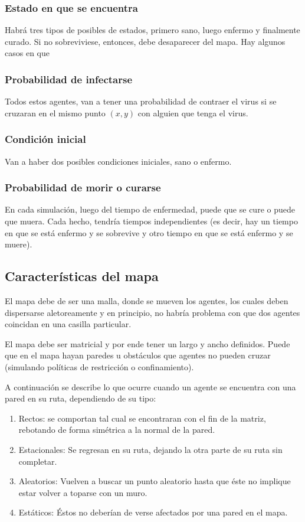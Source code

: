 \documentclass[11pt]{article}
\begin{document}
\subsubsection{Estado en que se encuentra}
Habrá tres tipos de posibles de estados, primero sano, luego enfermo y finalmente curado. Si no sobreviviese, entonces, debe desaparecer del mapa. Hay algunos casos en que 

\subsubsection{Probabilidad de infectarse}
Todos estos agentes, van a tener una probabilidad de contraer el virus si se cruzaran en el mismo punto $(x,y)$ con alguien que tenga el virus. 

\subsubsection{Condición inicial}
Van a haber dos posibles condiciones iniciales, sano o enfermo.

\subsubsection{Probabilidad de morir o curarse}
En cada simulación, luego del tiempo de enfermedad, puede que se cure o puede que muera. Cada hecho, tendría tiempos independientes (es decir, hay un tiempo en que se está enfermo y se sobrevive y otro tiempo en que se está enfermo y se muere). 	

\subsection{Características del mapa}

El mapa debe de ser una malla, donde se mueven los agentes, los cuales deben dispersarse aletoreamente y en principio, no habría problema con que dos agentes coincidan en una casilla particular.

El mapa debe ser matricial y por ende tener un largo y ancho definidos. Puede que en el mapa hayan paredes u obstáculos que agentes no pueden cruzar (simulando políticas de restricción o confinamiento). 

A continuación se describe lo que ocurre cuando un agente se encuentra con una pared en su ruta, dependiendo de su tipo:

\begin{enumerate}
\item Rectos: se comportan tal cual se encontraran con el fin de la matriz, rebotando  de forma simétrica a la normal de la pared.
\item Estacionales: Se regresan en su ruta, dejando la otra parte de su ruta sin completar.
\item Aleatorios: Vuelven a buscar un punto aleatorio hasta que éste no implique estar volver a toparse con un muro.
\item Estáticos: Éstos no deberían de verse afectados por una pared en el mapa. 
\end{enumerate}
\end{document}
